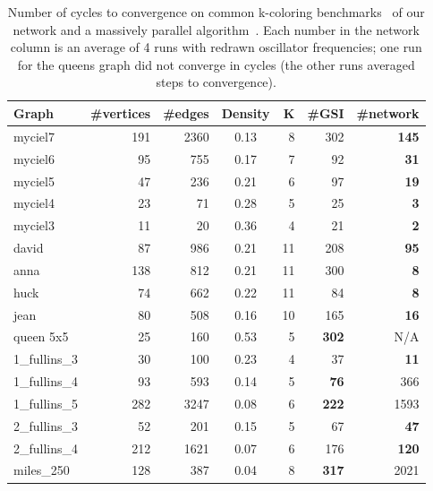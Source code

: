 \documentclass[10pt]{article}
\begin{document}
\begin{table}
\centering
\begin{tabular}{l r r c r r r }
\toprule
Graph & \#vertices & \#edges & Density & K & \#GSI & \#network \\
\midrule
myciel7 & 191 & 2360 & 0.13 & 8 & 302 & \textbf{145} \\
myciel6 & 95 & 755 & 0.17 & 7 & 92 & \textbf{31} \\
myciel5 & 47 & 236 & 0.21 & 6 &  97 & \textbf{19} \\
myciel4 & 23 & 71 & 0.28 & 5 & 25 & \textbf{3} \\
myciel3 & 11 & 20 & 0.36 & 4 &   21 & \textbf{2} \\
david & 87 & 986 & 0.21 & 11 & 208 & \textbf{95} \\
anna & 138 & 812 & 0.21 & 11 & 300 & \textbf{8} \\
huck &74 & 662 & 0.22 & 11 & 84 & \textbf{8} \\
jean & 80 & 508 & 0.16 & 10 & 165 & \textbf{16} \\
queen 5x5 & 25 & 160 & 0.53 & 5 & \textbf{302} & N/A \\ 
1\_fullins\_3 & 30 & 100 & 0.23 & 4 & 37 & \textbf{11} \\
1\_fullins\_4 & 93 & 593 & 0.14 & 5 & \textbf{76} & 366 \\
1\_fullins\_5 & 282 & 3247 & 0.08 & 6 & \textbf{222} & 1593 \\
2\_fullins\_3 & 52 & 201 & 0.15 & 5 & 67 & \textbf{47} \\
2\_fullins\_4 & 212 & 1621 & 0.07 & 6 & 176 & \textbf{120} \\
miles\_250 & 128 & 387 & 0.04 & 8 & \textbf{317} & 2021 \\
\bottomrule
\end{tabular}
\caption{Number of cycles to convergence on common k-coloring benchmarks~\cite{Ruiz_Romay11} of our network and a massively parallel algorithm~\cite{Ruiz_Romay11}. Each number in the network column is an average of 4 runs with redrawn oscillator frequencies; one run for the queens graph did not converge in  cycles (the other runs averaged  steps to convergence).}
\label{tab:kcol}
\end{table}
\end{document}
